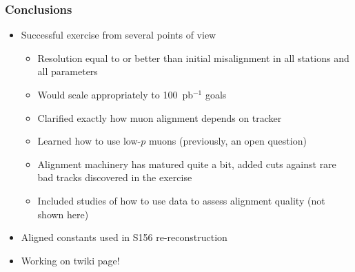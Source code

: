 \documentclass[compress]{beamer}
\begin{document}

\begin{frame}
\frametitle{Conclusions}

\begin{itemize}\setlength{\itemsep}{0.5 cm}
\item Successful exercise from several points of view
\begin{itemize}\setlength{\itemsep}{0.2 cm}
\item Resolution equal to or better than initial misalignment in all stations and all parameters
\item Would scale appropriately to 100~pb$^{-1}$ goals
\item Clarified exactly how muon alignment depends on tracker
\item Learned how to use low-$p$ muons (previously, an open question)
\item Alignment machinery has matured quite a bit, added cuts against rare bad tracks discovered in the exercise
\item Included studies of how to use data to assess alignment quality (not shown here)
\end{itemize}

\item Aligned constants used in S156 re-reconstruction

\item Working on twiki page!
\end{itemize}

\label{numpages}
\end{frame}
\end{document}
